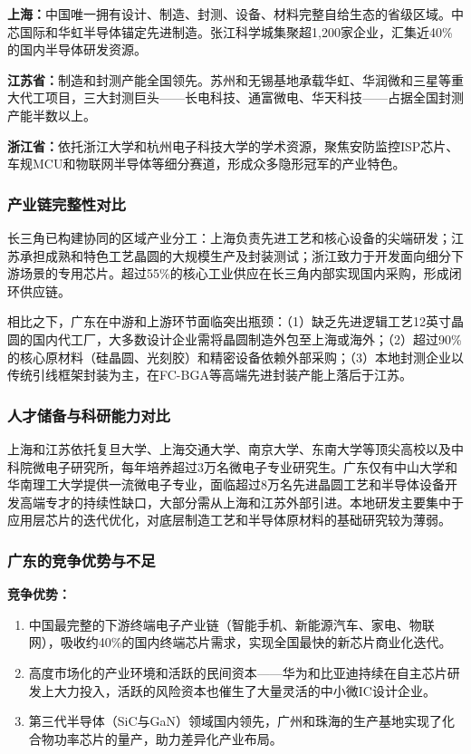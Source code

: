 \documentclass[12pt,a4paper]{article}
\begin{document}
\textbf{上海：}中国唯一拥有设计、制造、封测、设备、材料完整自给生态的省级区域。中芯国际和华虹半导体锚定先进制造。张江科学城集聚超1,200家企业，汇集近40\%的国内半导体研发资源。

\textbf{江苏省：}制造和封测产能全国领先。苏州和无锡基地承载华虹、华润微和三星等重大代工项目，三大封测巨头——长电科技、通富微电、华天科技——占据全国封测产能半数以上。

\textbf{浙江省：}依托浙江大学和杭州电子科技大学的学术资源，聚焦安防监控ISP芯片、车规MCU和物联网半导体等细分赛道，形成众多隐形冠军的产业特色。

\subsubsection{产业链完整性对比}

长三角已构建协同的区域产业分工：上海负责先进工艺和核心设备的尖端研发；江苏承担成熟和特色工艺晶圆的大规模生产及封装测试；浙江致力于开发面向细分下游场景的专用芯片。超过55\%的核心工业供应在长三角内部实现国内采购，形成闭环供应链。

相比之下，广东在中游和上游环节面临突出瓶颈：（1）缺乏先进逻辑工艺12英寸晶圆的国内代工厂，大多数设计企业需将晶圆制造外包至上海或海外；（2）超过90\%的核心原材料（硅晶圆、光刻胶）和精密设备依赖外部采购；（3）本地封测企业以传统引线框架封装为主，在FC-BGA等高端先进封装产能上落后于江苏。

\subsubsection{人才储备与科研能力对比}

上海和江苏依托复旦大学、上海交通大学、南京大学、东南大学等顶尖高校以及中科院微电子研究所，每年培养超过3万名微电子专业研究生。广东仅有中山大学和华南理工大学提供一流微电子专业，面临超过8万名先进晶圆工艺和半导体设备开发高端专才的持续性缺口，大部分需从上海和江苏外部引进。本地研发主要集中于应用层芯片的迭代优化，对底层制造工艺和半导体原材料的基础研究较为薄弱。

\subsubsection{广东的竞争优势与不足}

\textbf{竞争优势：}
\begin{enumerate}[label=(\arabic*)]
    \item 中国最完整的下游终端电子产业链（智能手机、新能源汽车、家电、物联网），吸收约40\%的国内终端芯片需求，实现全国最快的新芯片商业化迭代。
    \item 高度市场化的产业环境和活跃的民间资本——华为和比亚迪持续在自主芯片研发上大力投入，活跃的风险资本也催生了大量灵活的中小微IC设计企业。
    \item 第三代半导体（SiC与GaN）领域国内领先，广州和珠海的生产基地实现了化合物功率芯片的量产，助力差异化产业布局。
\end{enumerate}
\end{document}
